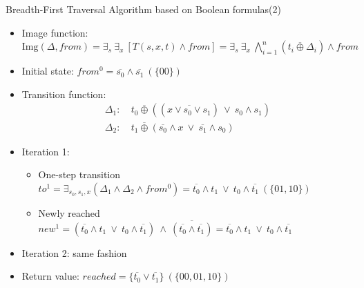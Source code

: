 \documentclass[xcolor=dvipsnames]{beamer}
\newcommand{\bi}{\begin{itemize}}
\newcommand{\ei}{\end{itemize}}
\begin{document}
\begin{frame}{\large{Breadth-First Traversal Algorithm based on Boolean formulas(2)}}
\bi
\item Image function: $\text{Img}(\Delta, from) = \exists _s ~\exists _x ~[ T(s, x, t)
  \land from ] = \exists _s ~\exists _x ~\bigwedge_
  {i=1}^{n} (t_i
\overline{\oplus } \Delta_i)\land from$
\item Initial state: $from^0 = \overline{s_0}\land\overline{s_1}~(\{00\})$
\item Transition function: 
\begin{align*}
\Delta_1: & ~t_0 \overline{\oplus} ((\overline{x \lor s_0 \lor s_1}) ~\lor~ s_0\land s_1)\\
\Delta_2: & ~t_1 \overline{\oplus} (\overline{s_0}\land x ~\lor~ \overline{s_1}\land s_0)
\end{align*}
\item Iteration 1: 
	\bi
	\item One-step transition $to^1 = \exists _{s_0, s_1, x} (\Delta_1 \land \Delta_2
	\land from^0) = \overline{t_0}\land t_1~\lor~t_0\land \overline{t_1}~(\{01,10\})$
	\item Newly reached $new^1 = (\overline{t_0}\land t_1~\lor~t_0\land\overline{t_1})~\land ~
	\overline{(\overline{t_0}\land\overline{t_1})} = \overline{t_0}\land t_1~\lor~t_0\land\overline{t_1}$
	\ei
\item Iteration 2: same fashion
\item Return value: $reached = \{\overline{t_0}\lor \overline{t_1}\}~(\{00,01,10\})$
\ei
\end{frame}
\end{document}
